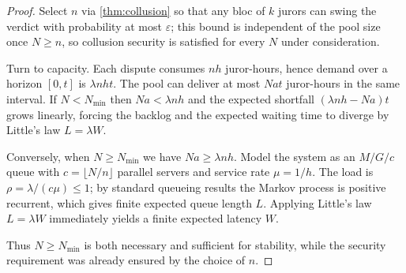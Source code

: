 \documentclass{article}
\begin{document}
\begin{proof}
Select \(n\) via \autoref{thm:collusion} so that any bloc of \(k\) jurors can swing the verdict with probability at most \(\varepsilon\); this bound is independent of the pool size once \(N\ge n\), so collusion security is satisfied for every \(N\) under consideration.

Turn to capacity.  Each dispute consumes \(n h\) juror-hours, hence demand over a horizon \([0,t]\) is $\lambda n h t$.  The pool can deliver at most \(Nat\) juror-hours in the same interval.  If \(N< N_{\min}\) then \(Na<\lambda n h\) and the expected shortfall \((\lambda n h-Na)t\) grows linearly, forcing the backlog and the expected waiting time to diverge by Little’s law \(L=\lambda W\).  

Conversely, when \(N\ge N_{\min}\) we have \(Na\ge\lambda n h\). Model the system as an \(M/G/c\) queue with \(c=\lfloor N/n\rfloor\) parallel servers and service rate \(\mu=1/h\).  The load is \(\rho=\lambda/(c\mu)\le 1\); by standard queueing results \cite{queuing-theory2018} the Markov process is positive recurrent, which gives finite expected queue length \(L\). Applying Little’s law \(L = \lambda W\) immediately yields a finite expected latency \(W\).

Thus \(N\ge N_{\min}\) is both necessary and sufficient for stability, while the security requirement was already ensured by the choice of \(n\).
\end{proof}
\end{document}
